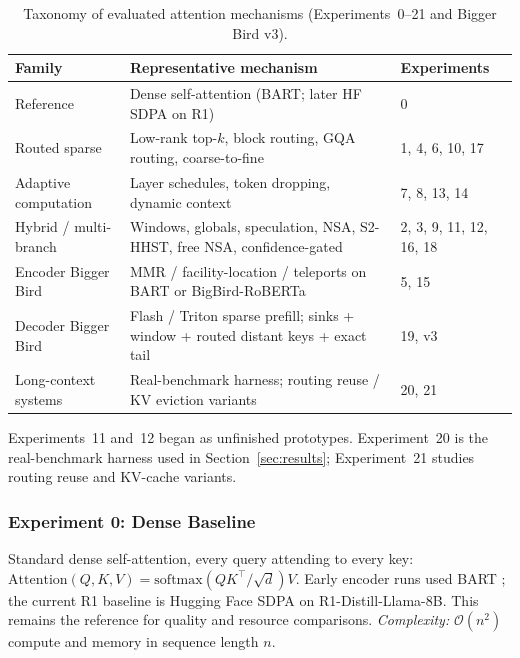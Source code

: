 \documentclass[11pt]{article}
\newcommand{\bigO}{\mathcal{O}}
\begin{document}
\begin{table}[ht]
  \centering
  \caption{Taxonomy of evaluated attention mechanisms (Experiments~0--21 and
  Bigger Bird v3).}
  \label{tab:taxonomy}
  \begin{tabularx}{\textwidth}{@{}l>{\raggedright\arraybackslash}Xl@{}}
    \toprule
    Family & Representative mechanism & Experiments \\
    \midrule
    Reference & Dense self-attention (BART; later HF SDPA on R1) & 0 \\
    Routed sparse & Low-rank top-$k$, block routing, GQA routing,
      coarse-to-fine & 1, 4, 6, 10, 17 \\
    Adaptive computation & Layer schedules, token dropping, dynamic context
      & 7, 8, 13, 14 \\
    Hybrid / multi-branch & Windows, globals, speculation, NSA, S2-HHST,
      free NSA, confidence-gated & 2, 3, 9, 11, 12, 16, 18 \\
    Encoder Bigger Bird & MMR / facility-location / teleports on BART or
      BigBird-RoBERTa & 5, 15 \\
    Decoder Bigger Bird & Flash / Triton sparse prefill; sinks + window +
      routed distant keys + exact tail & 19, v3 \\
    Long-context systems & Real-benchmark harness; routing reuse / KV
      eviction variants & 20, 21 \\
    \bottomrule
  \end{tabularx}
\end{table}

Experiments~11 and~12 began as unfinished prototypes. Experiment~20 is the
real-benchmark harness used in Section~\ref{sec:results}; Experiment~21 studies
routing reuse and KV-cache variants.


\subsubsection*{Experiment 0: Dense Baseline}
\label{exp:baseline}
Standard dense self-attention, every query attending to every key:
$\mathrm{Attention}(Q,K,V) = \mathrm{softmax}(QK^\top/\sqrt{d})V$. Early
encoder runs used BART \citep{lewis2020bart}; the current R1 baseline is
Hugging Face SDPA on R1-Distill-Llama-8B. This remains the reference for
quality and resource comparisons. \emph{Complexity:} $\bigO(n^2)$ compute and
memory in sequence length $n$.
\end{document}
